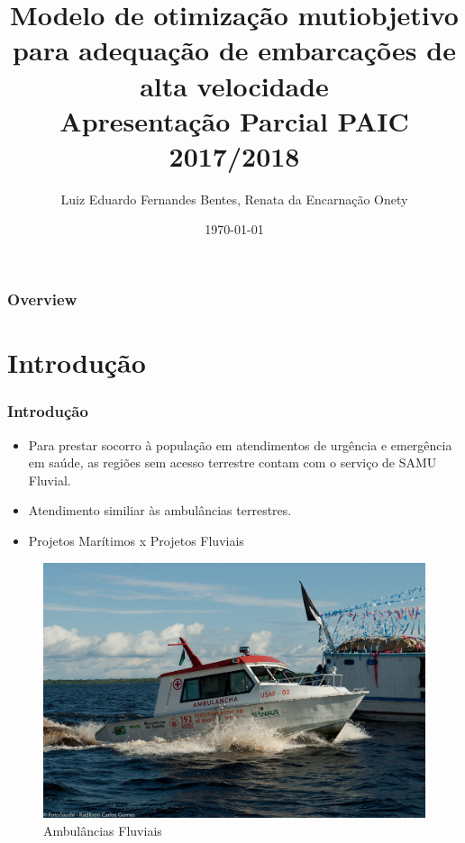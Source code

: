\documentclass{beamer}
\title[ ]{\textbf{Modelo de otimização mutiobjetivo para adequação de embarcações de alta velocidade}\\Apresentação Parcial PAIC 2017/2018} %
\author[L.E.F.B]{Luiz Eduardo Fernandes Bentes, Renata da Encarnação Onety} %
\institute[UEA] %
{
Universidade do Estado do Amazonas \\ Escola Superior de Tecnologia -- EST\\ Manaus - Amazonas - Brasil\\ %
\medskip
\textit{\{lefb.eng,ronety\} @uea.edu.br} %
}
\date{\today} %
\begin{document}
\begin{frame}
\titlepage %
\end{frame}

\begin{frame}
\frametitle{Overview}
\tableofcontents
\end{frame}

\section{Introdução} 
\begin{frame}
 \tableofcontents[ 
    currentsubsection, 
    hideothersubsections, 
    sectionstyle=show/shaded
    ] 
\end{frame}
\begin{frame}
\frametitle{Introdução}
\begin{itemize}
	\item Para prestar socorro à população em atendimentos de urgência e emergência em saúde, as regiões sem acesso terrestre contam com o serviço de SAMU Fluvial.
	\item Atendimento similiar às ambulâncias terrestres.
	\item Projetos Marítimos x Projetos Fluviais
\end{itemize}

\begin{figure}[h]
	\centering
	\includegraphics[scale=0.7]{samu17}
	\caption{Ambulâncias Fluviais}
	\label{fig:ambulancha}
\end{figure}

\end{frame}
\end{document}
